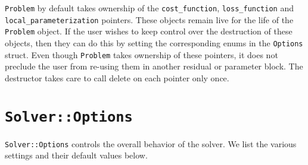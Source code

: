   \texttt{Problem} by default takes ownership of the
  \texttt{cost\_function}, \texttt{loss\_function} and \\ \texttt{local\_parameterization} pointers. These objects remain
   live for the life of the \texttt{Problem} object. If the user wishes to
  keep control over the destruction of these objects, then they can
  do this by setting the corresponding enums in the \texttt{Options} struct. Even though \texttt{Problem} takes ownership of these pointers,  it does not preclude the user from re-using them in another residual or parameter block. The destructor takes care to call
  delete on each  pointer only once.

\section{\texttt{Solver::Options}}
\texttt{Solver::Options} controls the overall behavior of the solver. We list the various settings and their default values below.

